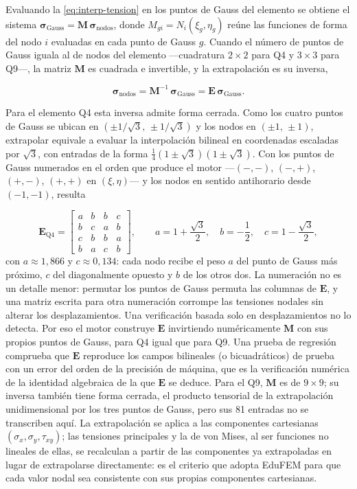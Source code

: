 Evaluando la \autoref{eq:interp-tension} en los puntos de Gauss del elemento se obtiene el sistema $\bm{\sigma}_{\text{Gauss}} = \bm{M}\,\bm{\sigma}_{\text{nodos}}$, donde $M_{gi} = N_i(\xi_g,\eta_g)$ reúne las funciones de forma del nodo $i$ evaluadas en cada punto de Gauss $g$. Cuando el número de puntos de Gauss iguala al de nodos del elemento —cuadratura $2\times2$ para Q4 y $3\times3$ para Q9—, la matriz $\bm{M}$ es cuadrada e invertible, y la extrapolación es su inversa,

\begin{equation}
\bm{\sigma}_{\text{nodos}} = \bm{M}^{-1}\,\bm{\sigma}_{\text{Gauss}} = \bm{E}\,\bm{\sigma}_{\text{Gauss}}.
\label{eq:extrap-inversa}
\end{equation}

Para el elemento Q4 esta inversa admite forma cerrada. Como los cuatro puntos de Gauss se ubican en $(\pm 1/\sqrt{3},\,\pm 1/\sqrt{3})$ y los nodos en $(\pm 1,\,\pm 1)$, extrapolar equivale a evaluar la interpolación bilineal en coordenadas escaladas por $\sqrt{3}$, con entradas de la forma $\tfrac{1}{4}(1\pm\sqrt{3})(1\pm\sqrt{3})$. Con los puntos de Gauss numerados en el orden que produce el motor —$(-,-)$, $(-,+)$, $(+,-)$, $(+,+)$ en $(\xi,\eta)$— y los nodos en sentido antihorario desde $(-1,-1)$, resulta

\begin{equation}
\bm{E}_{\text{Q4}} =
\begin{bmatrix}
a & b & b & c \\
b & c & a & b \\
c & b & b & a \\
b & a & c & b
\end{bmatrix},
\qquad
a = 1+\frac{\sqrt{3}}{2},\quad
b = -\frac{1}{2},\quad
c = 1-\frac{\sqrt{3}}{2},
\label{eq:extrap-q4}
\end{equation}
con $a \approx 1{,}866$ y $c \approx 0{,}134$: cada nodo recibe el peso $a$ del punto de Gauss más próximo, $c$ del diagonalmente opuesto y $b$ de los otros dos. La numeración no es un detalle menor: permutar los puntos de Gauss permuta las columnas de $\bm{E}$, y una matriz escrita para otra numeración corrompe las tensiones nodales sin alterar los desplazamientos. Una verificación basada solo en desplazamientos no lo detecta. Por eso el motor construye $\bm{E}$ invirtiendo numéricamente $\bm{M}$ con sus propios puntos de Gauss, para Q4 igual que para Q9. Una prueba de regresión comprueba que $\bm{E}$ reproduce los campos bilineales (o bicuadráticos) de prueba con un error del orden de la precisión de máquina, que es la verificación numérica de la identidad algebraica de la que $\bm{E}$ se deduce. Para el Q9, $\bm{M}$ es de $9\times9$; su inversa también tiene forma cerrada, el producto tensorial de la extrapolación unidimensional por los tres puntos de Gauss, pero sus 81 entradas no se transcriben aquí. La extrapolación se aplica a las componentes cartesianas $(\sigma_x,\sigma_y,\tau_{xy})$; las tensiones principales y la de von Mises, al ser funciones no lineales de ellas, se recalculan a partir de las componentes ya extrapoladas en lugar de extrapolarse directamente: es el criterio que adopta EduFEM para que cada valor nodal sea consistente con sus propias componentes cartesianas.

